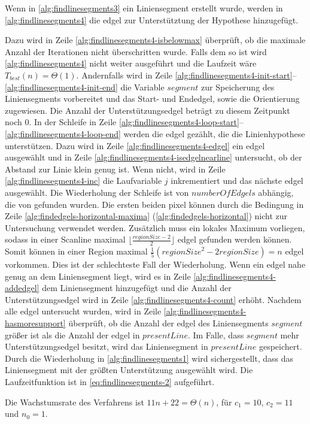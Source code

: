 Wenn in \autoref{alg:findlinesegments3} ein Liniensegment erstellt wurde, werden in \autoref{alg:findlinesegments4} die
 \gls{edgel} zur Unterstütztung der Hypothese hinzugefügt.

Dazu wird in Zeile \ref{alg:findlinesegments4-isbelowmax} überprüft, ob die maximale Anzahl der Iterationen nicht
 überschritten wurde. Falls dem so ist wird \autoref{alg:findlinesegments4} nicht weiter ausgeführt und die Laufzeit
 wäre $T_{best}(n) = \Theta(1)$. Andernfalls wird in Zeile
 \ref{alg:findlinesegments4-init-start}--\ref{alg:findlinesegments4-init-end} die Variable $\mathit{segment}$ zur
 Speicherung des Liniensegments vorbereitet und das Start- und Endedgel, sowie die Orientierung zugewiesen. Die Anzahl
 der Unterstützungsedgel beträgt zu diesem Zeitpunkt noch $0$. In der Schleife in Zeile
 \ref{alg:findlinesegments4-loop-start}--\ref{alg:findlinesegments4-loop-end} werden die \gls{edgel} gezählt, die die
 Linienhypothese unterstützen. Dazu wird in Zeile \ref{alg:findlinesegments4-edgel} ein \gls{edgel} ausgewählt und in
 Zeile \ref{alg:findlinesegments4-isedgelnearline} untersucht, ob der Abstand zur Linie klein genug ist. Wenn nicht,
 wird in Zeile \ref{alg:findlinesegments4-inc} die Laufvariable $j$ inkrementiert und das nächste \gls{edgel}
 ausgewählt. Die Wiederholung der Schleife ist von $\mathit{numberOfEdgels}$ abhängig, die von 
 gefunden wurden. Die ersten beiden \gls{pixel} können durch die Bedingung in Zeile
 \ref{alg:findedgels-horizontal-maxima} (\autoref{alg:findedgels-horizontal}) nicht zur Untersuchung verwendet werden.
 Zusätzlich muss ein lokales Maximum vorliegen, sodass in einer Scanline maximal
 $\bigl\lfloor\tfrac{\mathit{regionSize}-2}{2}\bigr\rfloor$ \gls{edgel} gefunden werden können. Somit können in einer
 Region maximal $\tfrac{1}{5}(\mathit{regionSize}^2 -2\mathit{regionSize}) = n$ \gls{edgel} vorkommen. Dies ist der
 schlechteste Fall der Wiederholung. Wenn ein \gls{edgel} nahe genug an dem Liniensegment liegt, wird es in Zeile
 \ref{alg:findlinesegments4-addedgel} dem Liniensegment hinzugefügt und die Anzahl der Unterstützungsedgel wird in
 Zeile \ref{alg:findlinesegments4-count} erhöht. Nachdem alle \gls{edgel} untersucht wurden, wird in Zeile
 \ref{alg:findlinesegments4-hasmoresupport} überprüft, ob die Anzahl der \gls{edgel} des Liniensegments
 $\mathit{segment}$ größer ist als die Anzahl der \gls{edgel} in $\mathit{presentLine}$. Im Falle, dass
 $\mathit{segment}$ mehr Unterstützungsedgel besitzt, wird das Liniensegment in $\mathit{presentLine}$ gespeichert.
 Durch die Wiederholung in \autoref{alg:findlinesegments1} wird sichergestellt, dass das Liniensegment mit der größten
 Unterstützung ausgewählt wird. Die Laufzeitfunktion ist in \autoref{eq:findlinesegments-2} aufgeführt.

Die Wachstumsrate des Verfahrens ist $11n + 22 = \Theta(n)$, für $c_{1} = 10$, $c_{2} = 11$ und $n_{0} = 1$.

